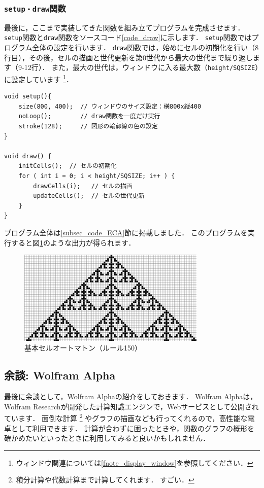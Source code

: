 \documentclass[dvipdfmx]{jsarticle}
\theoremstyle{definition}
\begin{document}
\subsubsection{\texttt{setup・draw}関数}  \label{subsubsec_draw_func}
最後に，ここまで実装してきた関数を組み立てプログラムを完成させます．
\verb|setup|関数と\verb|draw|関数をソースコード\ref{code_draw}に示します．
\verb|setup|関数ではプログラム全体の設定を行います．
\verb|draw|関数では，始めにセルの初期化を行い（8行目），その後，セルの描画と世代更新を第0世代から最大の世代まで繰り返します（9-12行）．
また，最大の世代は，ウィンドウに入る最大数（\verb|height/SQSIZE|）に設定しています
\footnote{
    ウィンドウ関連については\ref{fnote_display_window}を参照してください．
}．
%
\begin{lstlisting}[caption=\texttt{draw}関数, label=code_draw]
void setup(){
    size(800, 400);  // ウィンドウのサイズ設定：横800x縦400
    noLoop();        // draw関数を一度だけ実行
    stroke(128);     // 図形の輪郭線の色の設定
}

void draw() {
    initCells();  // セルの初期化
    for ( int i = 0; i < height/SQSIZE; i++ ) {
        drawCells(i);   // セルの描画
        updateCells();  // セルの世代更新
    }
}
\end{lstlisting}

プログラム全体は\ref{subsec_code_ECA}節に掲載しました．
このプログラムを実行すると図\ref{pic_eca}のような出力が得られます．
%
\begin{figure}[H]
    \centering
    \includegraphics[width=0.8\textwidth]{figure/eca/eca.png}
    \caption{基本セルオートマトン（ルール150）}
    \label{pic_eca}
\end{figure}

\subsection{余談: Wolfram Alpha}  \label{subsec_wolfram_alpha}
最後に余談として，Wolfram Alpha\cite{wolalp}の紹介をしておきます．
Wolfram Alphaは，Wolfram Researchが開発した計算知識エンジンで，Webサービスとして公開されています．
面倒な計算
\footnote{
    積分計算や代数計算まで計算してくれます．
    すごい．
}
やグラフの描画なども行ってくれるので，高性能な電卓として利用できます．
計算が合わずに困ったときや，関数のグラフの概形を確かめたいといったときに利用してみると良いかもしれません．
\end{document}
